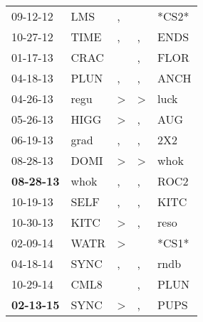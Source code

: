 \begin{supertabular}{p{0.07\textwidth}p{0.06\textwidth}p{0.02\textwidth}p{0.02\textwidth}p{0.06\textwidth}}
          09-12-12\textsuperscript{} &            LMS\textsuperscript{} &                , &               &                            *CS2* \\
          10-27-12\textsuperscript{} &           TIME\textsuperscript{} &                , &             , &           ENDS\textsuperscript{} \\
          01-17-13\textsuperscript{} &           CRAC\textsuperscript{} &                  &             , &           FLOR\textsuperscript{} \\
          04-18-13\textsuperscript{} &           PLUN\textsuperscript{} &                , &             , &           ANCH\textsuperscript{} \\
          04-26-13\textsuperscript{} &           regu\textsuperscript{} &     \textgreater &  \textgreater &           luck\textsuperscript{} \\
          05-26-13\textsuperscript{} &           HIGG\textsuperscript{} &     \textgreater &             , &            AUG\textsuperscript{} \\
          06-19-13\textsuperscript{} &           grad\textsuperscript{} &                , &             , &            2X2\textsuperscript{} \\
          08-28-13\textsuperscript{} &           DOMI\textsuperscript{} &     \textgreater &  \textgreater &           whok\textsuperscript{} \\
 \textbf{08-28-13\textsuperscript{}} &           whok\textsuperscript{} &                , &             , &           ROC2\textsuperscript{} \\
          10-19-13\textsuperscript{} &           SELF\textsuperscript{} &                , &             , &           KITC\textsuperscript{} \\
          10-30-13\textsuperscript{} &           KITC\textsuperscript{} &     \textgreater &             , &           reso\textsuperscript{} \\
          02-09-14\textsuperscript{} &           WATR\textsuperscript{} &     \textgreater &               &                            *CS1* \\
          04-18-14\textsuperscript{} &           SYNC\textsuperscript{} &                , &             , &           rndb\textsuperscript{} \\
          10-29-14\textsuperscript{} &           CML8\textsuperscript{} &                  &             , &           PLUN\textsuperscript{} \\
 \textbf{02-13-15\textsuperscript{}} &           SYNC\textsuperscript{} &     \textgreater &             , &           PUPS\textsuperscript{} \\

\end{supertabular}
